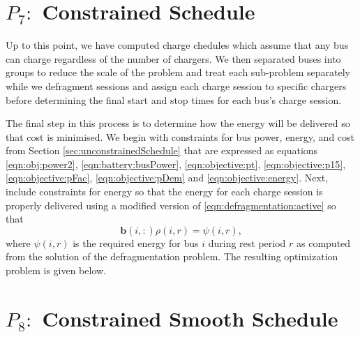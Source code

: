\section{$P_7:$ Constrained Schedule\label{sec:constrainedSchedule}}

Up to this point, we have computed charge chedules which assume that any bus can charge regardless of the number of chargers. We then separated buses into groups to reduce the scale of the problem and treat each sub-problem separately while we defragment sessions and assign each charge session to specific chargers before determining the final start and stop times for each bus's charge session.

\par The final step in this process is to determine how the energy will be delivered so that cost is minimised. We begin with constraints for bus power, energy, and cost from Section \ref{sec:unconstrainedSchedule} that are expressed as equations \eqref{eqn:obj:power2}, \eqref{eqn:battery:busPower}, \eqref{eqn:objective:pt}, \eqref{eqn:objective:p15}, \eqref{eqn:objective:pFac}, \eqref{eqn:objective:pDem} and \eqref{eqn:objective:energy}. Next, include constraints for energy so that the energy for each charge session is properly delivered using a modified version of \eqref{eqn:defragmentation:active} so that
\begin{equation}\label{eqn:constrainedSchedule:modified}
	\mathbf{b}(i,:)\rho(i,r) = \psi(i,r),
\end{equation}
where $\psi(i,r)$ is the required energy for bus $i$ during rest period $r$ as computed from the solution of the defragmentation problem.  The resulting optimization problem is given below.\\[0.1in]

\section{$P_8:$ Constrained Smooth Schedule\label{sec:constrainedSmoothSchedule}}

